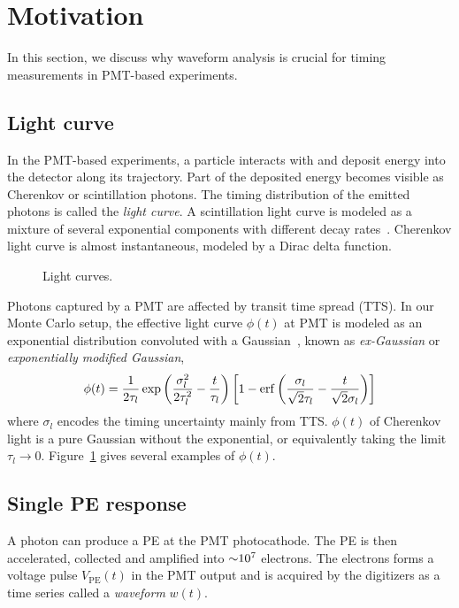 \section{Motivation}
\label{sec:toyMC}

In this section, we discuss why waveform analysis is crucial for timing measurements in PMT-based experiments. 

\subsection{Light curve}
In the PMT-based experiments, a particle interacts with and deposit energy into the detector along its trajectory. Part of the deposited energy becomes visible as Cherenkov or scintillation photons.  The timing distribution of the emitted photons is called the \textit{light curve}.  A scintillation light curve is modeled as a mixture of several exponential components with different decay rates~\cite{rebber_particle_2021}.  Cherenkov light curve is 
almost instantaneous, modeled by a Dirac delta function. 

\begin{figure}[!htb]
  \centering
  \resizebox{0.5\textwidth}{!}{}
  \caption{\label{fig:time-pro} Light curves.}
\end{figure}

Photons captured by a PMT are affected by transit time spread (TTS).  In our Monte Carlo setup, the effective light curve $\phi(t)$ at PMT is modeled as an exponential distribution convoluted with a Gaussian~\cite{li_separation_2016}, known as \textit{ex-Gaussian} or \textit{exponentially modified Gaussian}, 
\begin{align}
    \phi(t) = \frac{1}{2\tau_l} \exp\left(\frac{\sigma_l^2}{2\tau_l^2}-\frac{t}{\tau_l}\right) \left[1 - \operatorname{erf}\left( \frac{\sigma_l}{\sqrt{2}\tau_l} - \frac{t}{\sqrt{2}\sigma_l} \right)\right]
    \label{eq:time-pro}
\end{align}
where $\sigma_l$ encodes the timing uncertainty mainly from TTS.  $\phi(t)$ of Cherenkov light is a pure Gaussian without the exponential, or equivalently taking the limit $\tau_l \rightarrow 0$.  Figure~\ref{fig:time-pro} gives several examples of $\phi(t)$.

\subsection{Single PE response}
\label{subsec:spe}

A photon can produce a PE at the PMT photocathode.  The PE is then accelerated, collected and amplified into $\num[retain-unity-mantissa=false]{\sim 1e7}$ electrons.  The electrons forms a voltage pulse $V_\mathrm{PE}(t)$ in the PMT output and is acquired by the digitizers as a time series called a \textit{waveform} $w(t)$.

